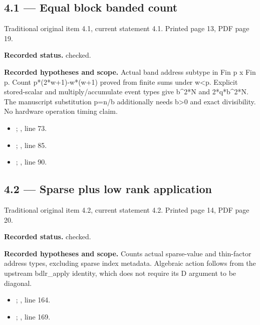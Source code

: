 \subsection{4.1 — Equal block banded count}
\label{result:4.1}
{\footnotesize\color{muted}Traditional original item 4.1, current statement 4.1. Printed page 13, PDF page 19.}\par
\textbf{Recorded status.} checked.

\textbf{Recorded hypotheses and scope.} Actual band address subtype in Fin p x Fin p. Count p*(2*w+1)-w*(w+1) proved from finite sums under w<p. Explicit stored-scalar and multiply/accumulate event types give b\textasciicircum{}2*N and 2*q*b\textasciicircum{}2*N. The manuscript substitution p=n/b additionally needs b>0 and exact divisibility. No hardware operation timing claim.

\begin{itemize}
\item {}; , line 73.
\item {}; , line 85.
\item {}; , line 90.
\end{itemize}
\subsection{4.2 — Sparse plus low rank application}
\label{result:4.2}
{\footnotesize\color{muted}Traditional original item 4.2, current statement 4.2. Printed page 14, PDF page 20.}\par
\textbf{Recorded status.} checked.

\textbf{Recorded hypotheses and scope.} Counts actual sparse-value and thin-factor address types, excluding sparse index metadata. Algebraic action follows from the upstream bdlr\_apply identity, which does not require its D argument to be diagonal.

\begin{itemize}
\item {}; , line 164.
\item {}; , line 169.
\end{itemize}
